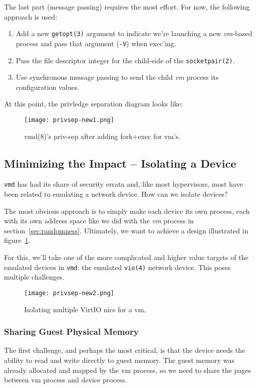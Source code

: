 \documentclass[conference]{IEEEtran}
\begin{document}
The last part (message passing) requires the most effort. For now, the
following approach is used:

\vspace{2mm}
\begin{enumerate}
\item Add a new \texttt{getopt(3)} argument to indicate we're
  launching a new \emph{vm}-based process and pass that argument
  (\texttt{-V}) when exec'ing.
\item Pass the file descriptor integer for the child-side of the
  \texttt{socketpair(2)}.
\item Use synchronous message passing to send the child \emph{vm}
  process its configuration values.
\end{enumerate}
\vspace{2mm}

At this point, the privledge separation diagram looks like:

\begin{figure}
  \texttt{[image: privsep-new1.png]}
  \caption{vmd(8)'s priv-sep after adding fork+exec for vm's.}
\end{figure}


\vspace{3mm}
\subsection{Minimizing the Impact -- Isolating a Device}
\texttt{vmd} has had its share of security errata and, like most
hypervisors, most have been related to emulating a network device. How
can we isolate devices?

The most obvious approach is to simply make each device its own
process, each with its own address space like we did with the
\emph{vm} process in section~\ref{sec:randomness}. Ultimately, we want
to achieve a design illustrated in figure~\ref{fig:new2}.

For this, we'll take one of the more complicated and higher value
targets of the emulated devices in \texttt{vmd}: the emulated
\texttt{vio(4)} network device. This poses multiple challenges.

\begin{figure}
  \label{fig:new2}
  \texttt{[image: privsep-new2.png]}
  \caption{Isolating multiple VirtIO nics for a vm.}
\end{figure}


\vspace{2mm}
\subsubsection{Sharing Guest Physical Memory}
The first challenge, and perhaps the most critical, is that the device
needs the ability to read and write directly to guest memory. The
guest memory was already allocated and mapped by the vm process, so we
need to share the pages between vm process and device process.
\end{document}
